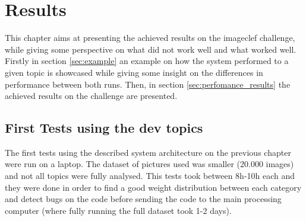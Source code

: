 \chapter{Results}
\label{ch:results}

This chapter aims at presenting the achieved results on the imageclef challenge, while giving some perspective on what did not work well and what worked well. Firstly in section \ref{sec:example} an example on how the system performed to a given topic is showcased while giving some insight on the differences in performance between both runs. Then, in section \ref{sec:perfomance_results} the achieved results on the challenge are presented.

\section{First Tests using the dev topics}

The first tests using the described system architecture on the previous chapter were run on a laptop. The dataset of pictures used was smaller (20.000 images) and not all topics were fully analysed. This tests took between 8h-10h each and they were done in order to find a good weight distribution between each category and  detect bugs on the code before sending the code to the main processing computer (where fully running the full dataset took 1-2 days).

